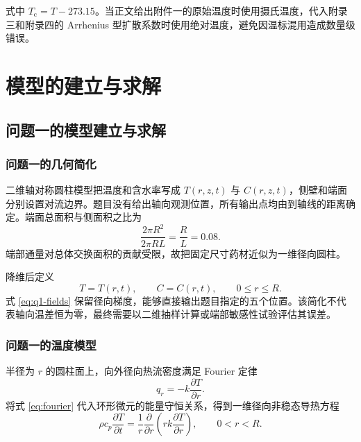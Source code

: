 \documentclass[withoutpreface,bwprint]{cumcmthesis}
\begin{document}
式中 \(T_{\mathrm{c}}=T-273.15\)。当正文给出附件一的原始温度时使用摄氏温度，代入附录三和附录四的 Arrhenius 型扩散系数时使用绝对温度，避免因温标混用造成数量级错误。

\section{模型的建立与求解}

\subsection{问题一的模型建立与求解}

\subsubsection{问题一的几何简化}

二维轴对称圆柱模型把温度和含水率写成 \(T(r,z,t)\) 与 \(C(r,z,t)\)，侧壁和端面分别设置对流边界\cite{hussain2003}。题目没有给出轴向观测位置，所有输出点均由到轴线的距离确定。端面总面积与侧面积之比为
\begin{equation}
\frac{2\pi R^2}{2\pi RL}=\frac{R}{L}=0.08.
\label{eq:end-side-ratio}
\end{equation}
端部通量对总体交换面积的贡献受限，故把固定尺寸药材近似为一维径向圆柱。

降维后定义
\begin{equation}
T=T(r,t),\qquad C=C(r,t),\qquad 0\leq r\leq R.
\label{eq:q1-fields}
\end{equation}
式 \ref{eq:q1-fields} 保留径向梯度，能够直接输出题目指定的五个位置。该简化不代表轴向温差恒为零，最终需要以二维抽样计算或端部敏感性试验评估其误差。


\subsubsection{问题一的温度模型}

半径为 \(r\) 的圆柱面上，向外径向热流密度满足 Fourier 定律
\begin{equation}
q_r=-k\frac{\partial T}{\partial r}.
\label{eq:fourier}
\end{equation}
将式 \ref{eq:fourier} 代入环形微元的能量守恒关系，得到一维径向非稳态导热方程
\begin{equation}
\rho c_p\frac{\partial T}{\partial t}
=
\frac{1}{r}\frac{\partial}{\partial r}
\left(
r k\frac{\partial T}{\partial r}
\right),
\qquad 0<r<R.
\label{eq:heat-pde}
\end{equation}
\end{document}
